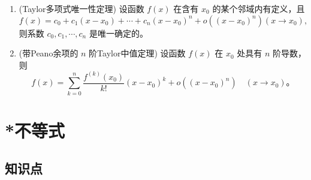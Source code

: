 \documentclass[UTF8]{ctexart}
\theoremstyle{remark}
\begin{document}
\begin{enumerate}
		\item (Taylor多项式唯一性定理) 设函数 $f(x)$ 在含有 $x_{0}$ 的某个邻域内有定义，且
		\[
		f(x)=c_{0}+c_{1}\left(x-x_{0}\right)+\cdots+c_{n}\left(x-x_{0}\right)^{n}+o\left(\left(x-x_{0}\right)^{n}\right)\left(x \to x_{0}\right),
		\]
		则系数 $c_{0}, c_{1}, \cdots, c_{n}$ 是唯一确定的。
		
		\item (带Peano余项的 $n$ 阶Taylor中值定理) 设函数 $f(x)$ 在 $x_{0}$ 处具有 $n$ 阶导数，则
		\[
		f(x)=\sum_{k=0}^{n} \frac{f^{(k)}\left(x_{0}\right)}{k !}\left(x-x_{0}\right)^{k}+o\left(\left(x-x_{0}\right)^{n}\right) \quad\left(x \to x_{0}\right)。
		\]
	\end{enumerate}
	
	\section{*不等式}
	
	\subsection*{知识点}
	
\end{document}

